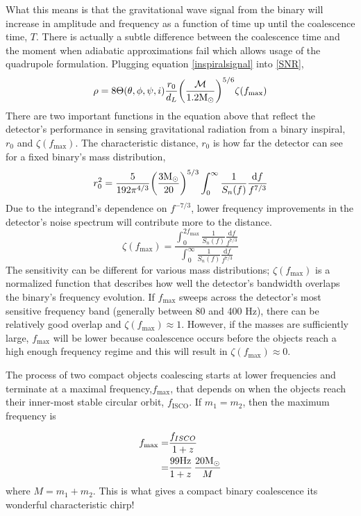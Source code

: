 	What this means is that the gravitational wave signal from the binary will increase in amplitude and frequency as a function of time up until the coalescence time, $T$.  There is actually a subtle difference between the coalescence time and the moment when adiabatic approximations fail which allows usage of the quadrupole formulation. Plugging equation \ref{inspiralsignal} into \ref{SNR},
	\begin{equation}
	\rho = 8 \Theta(\theta,\phi,\psi,i) \frac{r_0}{d_L} \bigg(\frac{\mathcal{M}}{1.2 \textup{M}_\odot}\bigg)^{5/6} \zeta(f_{\text{max}})
	\end{equation}
	There are two important functions in the equation above that reflect the detector's performance in sensing gravitational radiation from a binary inspiral, $r_0$ and $\zeta(f_{\text{max}})$.  The characteristic distance, $r_0$ is how far the detector can see for a fixed binary's mass distribution,
	\begin{equation}\label{char_r0}
	r_0^2 = \frac{5}{192\pi^{4/3}} \bigg(\frac{3\textup{M}_\odot}{20}\bigg)^{5/3}   \int_{0}^{\infty} \frac{1}{S_n(f)} \frac{\text{d} f}{f^{7/3}}
	\end{equation}
	Due to the integrand's dependence on $f^{-7/3}$, lower frequency improvements in the detector's noise spectrum will contribute more to the distance.
	\begin{equation}\label{zeta}
	\zeta(f_{\text{max}}) = \frac{\int_{0}^{2f_{\text{max}}} \frac{1}{S_n(f)} \frac{\text{d} f}{f^{7/3}}}{\int_{0}^{\infty} \frac{1}{S_n(f)} \frac{\text{d} f}{f^{7/3}}}
	\end{equation}
	The sensitivity can be different for various mass distributions; $\zeta(f_{\text{max}})$ is a normalized function that describes how well the detector's bandwidth overlaps the binary's frequency evolution.  If $f_{\text{max}}$ sweeps across the detector's most sensitive frequency band (generally between 80 and 400 Hz), there can be relatively good overlap and  $\zeta(f_{\text{max}})\approx 1$.  However, if the masses are sufficiently large, $f_{\text{max}}$ will be lower because coalescence occurs before the objects reach a high enough frequency regime and this will result in  $\zeta(f_{\text{max}})\approx 0$.
	
	The process of two compact objects coalescing starts at lower frequencies and terminate at a maximal frequency,$f_{\text{max}}$, that depends on when the objects reach their inner-most stable circular orbit, $f_{\text{ISCO}}$.   If $m_1=m_2$, then the maximum frequency is \cite{Finn:1995}
	
	\begin{equation}
	\begin{aligned}
	f_{\text{max}}	=&  \frac{f_{ISCO}}{1+z} \\
			=&	\frac{99 \text{Hz}}{1+z} \, \frac{20 \textup{M}_\odot}{M}
	\end{aligned}
	\end{equation}
	where $M=m_1+m_2$.  This is what gives a compact binary coalescence its wonderful characteristic chirp!